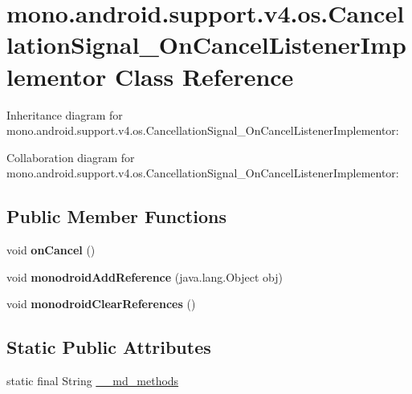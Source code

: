 \hypertarget{classmono_1_1android_1_1support_1_1v4_1_1os_1_1_cancellation_signal___on_cancel_listener_implementor}{}\section{mono.\+android.\+support.\+v4.\+os.\+Cancellation\+Signal\+\_\+\+On\+Cancel\+Listener\+Implementor Class Reference}
\label{classmono_1_1android_1_1support_1_1v4_1_1os_1_1_cancellation_signal___on_cancel_listener_implementor}


Inheritance diagram for mono.\+android.\+support.\+v4.\+os.\+Cancellation\+Signal\+\_\+\+On\+Cancel\+Listener\+Implementor\+:


Collaboration diagram for mono.\+android.\+support.\+v4.\+os.\+Cancellation\+Signal\+\_\+\+On\+Cancel\+Listener\+Implementor\+:
\subsection*{Public Member Functions}
\begin{DoxyCompactItemize}
\item 
\mbox{\label{classmono_1_1android_1_1support_1_1v4_1_1os_1_1_cancellation_signal___on_cancel_listener_implementor_a14a9b4bed965f010e2120c2eb10e68af}} 
void {\bfseries on\+Cancel} ()
\item 
\mbox{\label{classmono_1_1android_1_1support_1_1v4_1_1os_1_1_cancellation_signal___on_cancel_listener_implementor_a1d777c1a6c121dac15f3b673e277fc82}} 
void {\bfseries monodroid\+Add\+Reference} (java.\+lang.\+Object obj)
\item 
\mbox{\label{classmono_1_1android_1_1support_1_1v4_1_1os_1_1_cancellation_signal___on_cancel_listener_implementor_a2f6d27789484ee49837d8ebf4dd88e5e}} 
void {\bfseries monodroid\+Clear\+References} ()
\end{DoxyCompactItemize}
\subsection*{Static Public Attributes}
\begin{DoxyCompactItemize}
\item 
static final String \hyperlink{classmono_1_1android_1_1support_1_1v4_1_1os_1_1_cancellation_signal___on_cancel_listener_implementor_a5eec9005f7084d8e489ea6fbe475df40}{\+\_\+\+\_\+md\+\_\+methods}
\end{DoxyCompactItemize}


